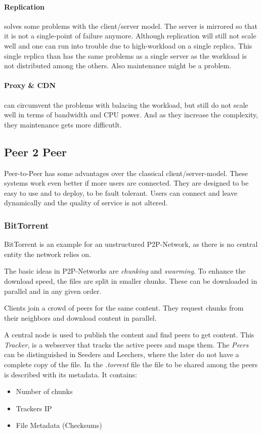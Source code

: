 \paragraph{Replication} %
\label{par:replication}
solves some problems with the client/server model.
The server is mirrored so that it is not a single-point of failure anymore.
Although replication will still not scale well
and one can run into trouble due to high-workload on a single replica.
This single replica than has the same problems as a single server
as the workload is not distributed among the others.
Also maintenance might be a problem.

\paragraph{Proxy \& CDN} %
\label{par:proxy_&_cdn}
can circumvent the problems with balacing the workload,
but still do not scale well in terms of bandwidth and CPU power.
And as they increase the complexity,
they maintenance gets more difficutlt.

\subsection{Peer 2 Peer} %
\label{sub:peer_2_peer}
Peer-to-Peer has some advantages over the classical client/server-model.
These systems work even better if more users are connected.
They are designed to be easy to use and to deploy,
to be fault tolerant.
Users can connect and leave dynamically and the quality of service is not altered.

\subsubsection{BitTorrent} %
\label{par:bittorrent}
BitTorrent is an example for an unstructured P2P-Network,
as there is no central entity the network relies on.

The basic ideas in P2P-Networks are \emph{chunking} and \emph{swarming}.
To enhance the download speed,
the files are split in smaller chunks.
These can be downloaded in parallel
and in any given order.

Clients join a crowd of peers for the same content.
They request chunks from their neighbors
and download content in parallel.

A central node is used to publish the content
and find peers to get content.
This \emph{Tracker}, is a webserver that tracks the active peers
and maps them.
The \emph{Peers} can be distinguished in Seeders and Leechers,
where the later do not have a complete copy of the file.
In the \emph{.torrent} file the file to be shared among the peers is described with its metadata.
It contains:\\
\begin{itemize}
	\item Number of chunks
	\item Trackers IP
	\item File Metadata (Checksums)
\end{itemize}

